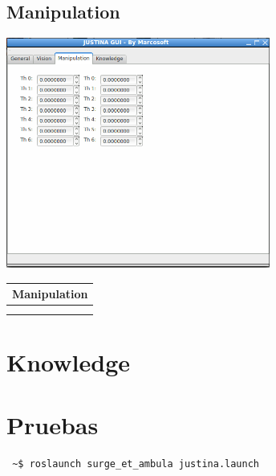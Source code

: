 \documentclass[user_manual.tex]{subfiles}
\begin{document}
\subsection{Manipulation}

\begin{center}
\includegraphics[width=0.65\textwidth]{Figures/Puesta_marcha/Manipulation.png}
\end{center}

\begin{table}[H]
\begin{center}
\begin{tabular}{|l|l|}%

\hline
\multicolumn{2}{|c|}{Manipulation}\\ \hline
   &  \\ \hline 
   & \\ \hline

\end{tabular}
\end{center}
\end{table}

\section{Knowledge}

\section{Pruebas}
\begin{verbatim}
 ~$ roslaunch surge_et_ambula justina.launch
\end{verbatim}
\end{document}
